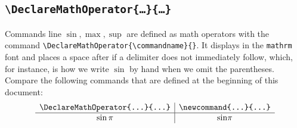 \documentclass[12pt]{article}
\newcommand{\notAMathOperator}{\mathrm{sin}}
\DeclareMathOperator{\aMathOperator}{sin}
\begin{document}
    \subsection{\texttt{\textbackslash DeclareMathOperator\{\dots\}\{\dots\}}}
    Commands line $\sin, \max, \sup$ are defined as math operators with the command \verb$\DeclareMathOperator{\commandname}{$\verb$}$. It displays  in the \texttt{mathrm} font and places a space after  if a delimiter does not immediately follow, which, for instance, is how we write $\sin$ by hand when we omit the parentheses. \p
    Compare the following commands that are defined at the beginning of this document: 
    \[
        \begin{array}{c|c}
            \texttt{\textbackslash DeclareMathOperator\{\dots\}\{\dots\}} & \texttt{\textbackslash newcommand\{\dots\}\{\dots\}} \\ \hline
            \aMathOperator\pi & \notAMathOperator\pi         
        \end{array}
    \]
\end{document}
